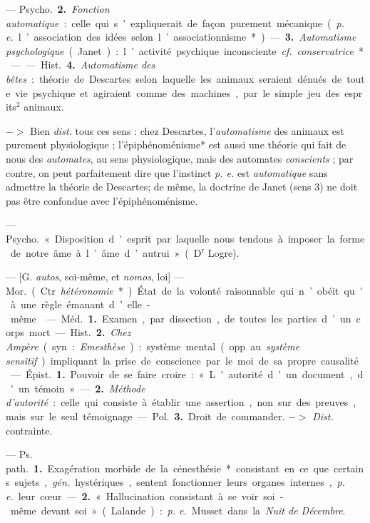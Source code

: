 \begin{itemize}[leftmargin=1cm, label=, itemsep=1pt]
— \si{Psycho.} {\bf 2.} {\it Fonction automatique} : celle qui s’expliquerait de
façon purement mécanique ({\it p. e.} l’association des idées selon
l’associationnisme*). — {\bf 3.} {\it Automatisme psychologique} (Janet) :
l’activité psychique inconsciente. {\it cf.}  {\it conservatrice}*.

—— \si{Hist.} {\bf 4.} {\it Automatisme des bêtes} :
théorie de Descartes selon laquelle
les animaux seraient dénués de toute
vie psychique et agiraient comme
des machines, par le simple jeu des
esprits$^2$ animaux.

$->$ Bien {\it dist.} tous ces sens :
chez Descartes, l’{\it automatisme} des
animaux est purement physiologique ; l’épiphénoménisme* est aussi
une théorie qui fait de nous des
{\it automates}, au sens physiologique,
mais des automates {\it conscients} ; par
contre, on peut parfaitement dire
que l'instinct {\it p. e.} est {\it automatique}
sans admettre la théorie de Descartes; de même, la doctrine de
Janet (sens 3) ne doit pas être confondue avec l’épiphénoménisme.

 — \si{Psycho.} « Disposition d'esprit par laquelle nous
tendons à imposer la forme de notre
âme à l’âme d’autrui » (D$^\text{r}$ Logre).

 — [G. {\it autos}, soi-même, et
{\it nomos}, loi] — \si{Mor.} (Ctr. {\it hétéronomie}*). État de la volonté
raisonnable qui n’obéit qu'à une règle
émanant d’elle-même.

 — \si{Méd.} {\bf 1.} Examen, par dissection, de toutes les parties d’un
corps mort. — \si{Hist.} {\bf 2.} {\it Chez Ampère}
(syn. : {\it Emesthèse}) : système mental
(opp. au {\it système sensitif}) impliquant
la prise de conscience par le moi de
sa propre causalité.

 — \si{Épist.} {\bf 1.} Pouvoir de se
faire croire : « L'autorité d’un document, d'un témoin ». — {\bf 2.} {\it Méthode
d'autorité} : celle qui consiste à établir
une assertion, non sur des preuves,
mais sur le seul témoignage.

— \si{Pol.} {\bf 3.} Droit de commander.
$->$ {\it Dist.} contrainte.

 — \si{Ps. path.} {\bf 1.} Exagération morbide de
la cénesthésie* consistant en ce que certains sujets,  {\it gén.}
hystériques, sentent fonctionner
leurs organes internes, {\it p. e.} leur
cœur. — {\bf 2.} « Hallucination consistant à se voir soi-même devant soi »
(Lalande) : {\it p. e.} Musset dans la {\it Nuit
de Décembre}.


\end{itemize}
